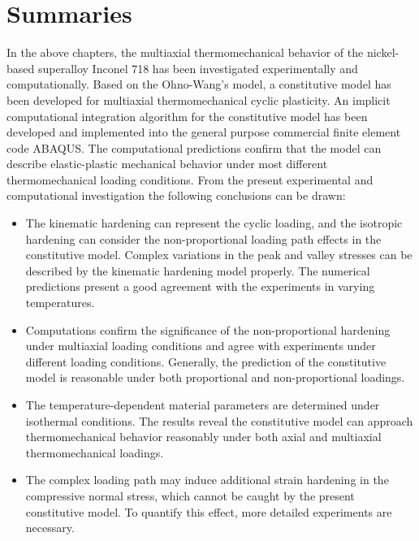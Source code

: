 \section{Summaries}
\noindent
In the above chapters, the multiaxial thermomechanical behavior of the nickel-based superalloy Inconel 718 has been investigated experimentally and computationally.
Based on the Ohno-Wang's model, a constitutive model has been developed for multiaxial thermomechanical cyclic plasticity.
An implicit computational integration algorithm for the constitutive model has been developed and implemented into the general purpose commercial finite element code ABAQUS. The computational predictions confirm that the model can describe elastic-plastic mechanical behavior under most different thermomechanical loading conditions.
From the present experimental and computational investigation the following conclusions can be drawn:
\begin{itemize}

\item {The kinematic hardening can represent the cyclic loading, and the isotropic hardening can consider the non-proportional loading path effects in the constitutive model.
Complex variations in the peak and valley stresses can be described by the kinematic hardening model properly. The numerical predictions present a good agreement with the experiments in varying temperatures.}

\item {Computations confirm the significance of the non-proportional hardening under multiaxial loading conditions and agree with experiments under different loading conditions. Generally, the prediction of the constitutive model is reasonable under both proportional and non-proportional loadings.}

\item {The temperature-dependent material parameters are determined under isothermal conditions. The results reveal the constitutive model can approach thermomechanical behavior reasonably under both axial and multiaxial thermomechanical loadings.}

\item{The complex loading path may induce additional strain hardening in the compressive normal stress, which cannot be caught by the present constitutive model. To quantify this effect, more detailed experiments are necessary.} 

\end{itemize}